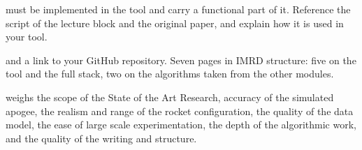 must be implemented in the tool and carry a functional part of it. Reference the script of the lecture block and the original paper, and explain how it is used in your tool. 

 and a link to your GitHub
repository. Seven pages in IMRD structure: five on the tool and the full stack,
two on the algorithms taken from the other modules.



 weighs the scope of the State of the Art Research, accuracy of the simulated apogee, the realism and range of
the rocket configuration, the quality of the data model, the ease of large scale experimentation,
the depth of the algorithmic work, and the quality of the writing and structure.
